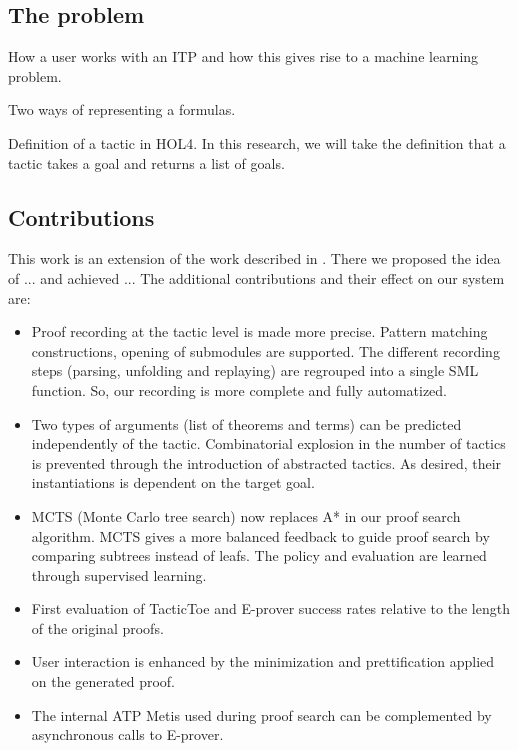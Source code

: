 \documentclass[runningheads,a4paper,draft]{svjour3}
\newcommand{\todoi}[1]{\todo[inline]{#1}}
\def\holfour{\textsf{HOL4}\xspace}
\def\eprover{\textsf{E-prover}\xspace}
\def\sml{\textsf{SML}\xspace}
\def\metis{\textsf{Metis}\xspace}
\def\tactictoe{\textsf{TacticToe}\xspace}
\begin{document}
\subsection{The problem}\todo{ }

How a user works with an ITP and how this gives rise to a machine learning problem.

Two ways of representing a formulas.

Definition of a tactic in \holfour. In this research, we will take the definition
that a tactic takes a goal and returns a list of goals.



\subsection{Contributions}
This work is an extension of the work described in \cite{tgckju-lpar17}.
There we proposed the idea of ... and achieved ...
The additional contributions and their effect on our system are:

\todoi{add prediction of 4 kinds of things}
\begin{itemize}
\item Proof recording at the tactic level is made more precise. Pattern 
matching constructions, opening of submodules are supported. The different 
recording steps (parsing, unfolding and replaying) are regrouped into a single 
\sml function. So, our recording is more complete and fully automatized.
\item Two types of arguments (list of theorems and terms) can be predicted 
independently of the tactic. Combinatorial explosion in the number of tactics 
is prevented through the introduction of abstracted tactics. As desired, their 
instantiations is dependent on the target goal.
\item MCTS (Monte Carlo tree search) now replaces A* in our proof search 
algorithm. MCTS gives a more balanced feedback to guide proof search by 
comparing subtrees instead of leafs. The policy and evaluation are learned 
through supervised learning.

\item First evaluation of \tactictoe and \eprover success rates relative to 
the length of the original proofs.
\item User interaction is enhanced by the minimization and prettification 
applied on the generated proof.
\item The internal ATP \metis used during proof search can be complemented 
by asynchronous calls to \eprover.
\end{itemize}
\end{document}
